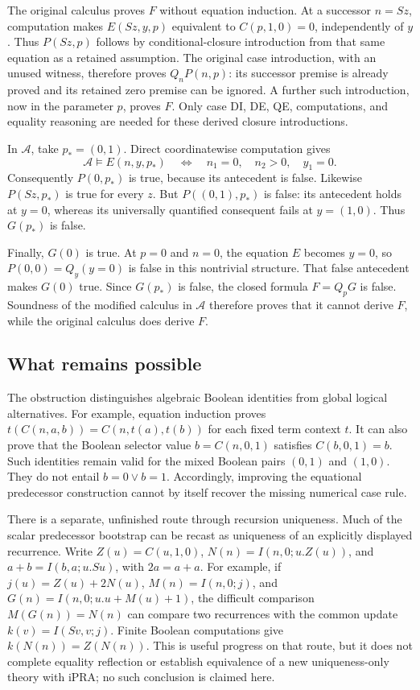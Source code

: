 The original calculus proves $F$ without equation induction.  At a
successor $n=Sz$, computation makes $E(Sz,y,p)$ equivalent to
$C(p,1,0)=0$, independently of $y$.  Thus $P(Sz,p)$ follows by
conditional-closure introduction from that same equation as a retained
assumption.  The original case introduction, with an unused witness,
therefore proves $Q_nP(n,p)$: its successor premise is already proved and
its retained zero premise can be ignored.  A further such introduction,
now in the parameter $p$, proves $F$.  Only case DI, DE, QE, computations,
and equality reasoning are needed for these derived closure introductions.

In $\mathcal A$, take $p_*=(0,1)$.  Direct coordinatewise computation gives
\[
 \mathcal A\models E(n,y,p_*)
 \quad\Longleftrightarrow\quad
 n_1=0,\quad n_2>0,\quad y_1=0.
\]
Consequently $P(0,p_*)$ is true, because its antecedent is false.
Likewise $P(Sz,p_*)$ is true for every $z$.  But $P((0,1),p_*)$ is
false: its antecedent holds at $y=0$, whereas its universally quantified
consequent fails at $y=(1,0)$.  Thus $G(p_*)$ is false.

Finally, $G(0)$ is true.  At $p=0$ and $n=0$, the equation $E$ becomes
$y=0$, so $P(0,0)=Q_y(y=0)$ is false in this nontrivial structure.  That
false antecedent makes $G(0)$ true.  Since $G(p_*)$ is false, the closed
formula $F=Q_pG$ is false.  Soundness of the modified calculus in
$\mathcal A$ therefore proves that it cannot derive $F$, while the
original calculus does derive $F$.

\subsection{What remains possible}

The obstruction distinguishes algebraic Boolean identities from global
logical alternatives.  For example, equation induction proves
$t(C(n,a,b))=C(n,t(a),t(b))$ for each fixed term context $t$.
It can also prove that the Boolean selector value $b=C(n,0,1)$ satisfies
$C(b,0,1)=b$.  Such identities remain valid for the mixed Boolean pairs
$(0,1)$ and $(1,0)$.  They do not entail $b=0\lor b=1$.
Accordingly, improving the equational predecessor construction cannot by
itself recover the missing numerical case rule.

There is a separate, unfinished route through recursion uniqueness.
Much of the scalar predecessor bootstrap can be recast as uniqueness of
an explicitly displayed recurrence. Write
$Z(u)=C(u,1,0)$, $N(n)=I(n,0;u.Z(u))$, and
$a+b=I(b,a;u.Su)$, with $2a=a+a$. For example, if
$j(u)=Z(u)+2N(u)$, $M(n)=I(n,0;j)$, and
$G(n)=I(n,0;u.u+M(u)+1)$, the difficult comparison
$M(G(n))=N(n)$ can compare two recurrences with the common update
$k(v)=I(Sv,v;j)$.  Finite Boolean computations give
$k(N(n))=Z(N(n))$.  This is useful progress on that route, but it does not
complete equality reflection or establish equivalence of a new
uniqueness-only theory with iPRA; no such conclusion is claimed here.

